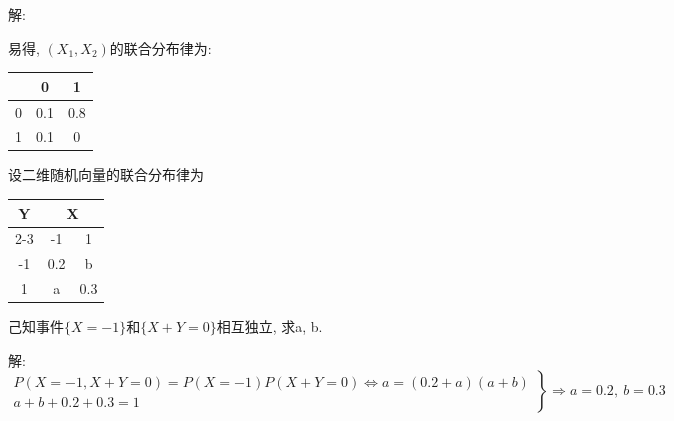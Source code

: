 \documentclass[standard]{ExBook}
\renewenvironment{shaded}{%
  \def\FrameCommand{\fboxsep=\FrameSep \colorbox{shadecolor}}%
  \MakeFramed{\advance\hsize-\width \FrameRestore}%
}{%
  \endMakeFramed
}
\begin{document}
\begin{qitems}
解: 

易得, $(X_1,X_2)$的联合分布律为:
\begin{footnotesize}
\begin{center}
    \renewcommand{\arraystretch}{1.2}
    \setlength{\tabcolsep}{20pt}
    \begin{tabular}{c|c|c}
	    \hline
	    \diagbox{$X_2$}{$P(X_1,X_2)$}{$X_1$} & 0 & 1 \\
	    \hline
	    0 & 0.1 & 0.8 \\
	    \hline
	    1 & 0.1 & 0 \\
	    \hline
    \end{tabular}
\end{center}
\end{footnotesize}

\vspace{2.5cm-5em}

    \begin{bbox}
    \begin{shaded}
        \qitem
设二维随机向量的联合分布律为
\begin{center}
    \renewcommand{\arraystretch}{1}
    \setlength{\tabcolsep}{6em}
    \begin{threeparttable}
    \begin{tabular}{c|cc}
        \hline
        \multirow{2}{*}{Y} & \multicolumn{2}{c}{X}\\
        \cline{2-3}
        & -1 & 1\\
        \hline
        -1 & 0.2 & b \\
        \hline
        1 & a & 0.3\\
        \hline
    \end{tabular}
    \end{threeparttable}
\end{center}
己知事件$\{X = -1\}$和$\{X +Y =0\}$相互独立, 求a, b.
    \end{shaded}
    \end{bbox}

\vspace{\dimexpr2.5cm-5em\relax}

解: 
$$
    \left.
    \begin{array}{r}
        P(X=-1,X+Y=0)=P(X=-1)P(X+Y=0) \Longleftrightarrow a=(0.2+a)(a+b)\\
        a+b+0.2+0.3=1
    \end{array}
    \right\}
    \Longrightarrow
    a=0.2,\ b=0.3
$$

\vspace{2.5cm-5em}


\end{qitems}
\end{document}
